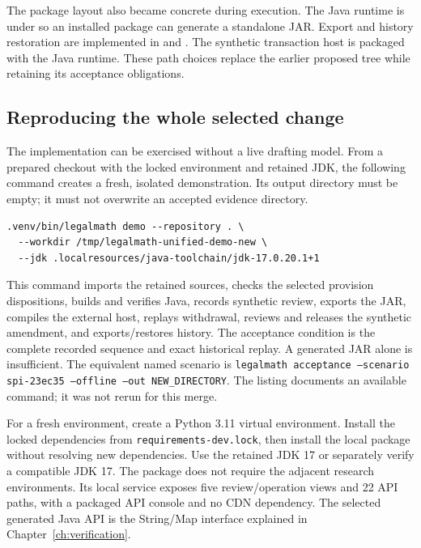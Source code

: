 The package layout also became concrete during execution. The Java runtime is
under  so an installed package can generate a
standalone JAR. Export and history restoration are implemented in
 and
. The synthetic transaction host is
packaged with the Java runtime. These path choices replace the earlier proposed
tree while retaining its acceptance obligations.

\subsection{Reproducing the whole selected change}

The implementation can be exercised without a live drafting model. From a
prepared checkout with the locked environment and retained JDK, the following
command creates a fresh, isolated demonstration. Its output directory must be
empty; it must not overwrite an accepted evidence directory.

\begin{lstlisting}[caption={Reproduce the complete local workbench scenario in a new directory.}]
.venv/bin/legalmath demo --repository . \
  --workdir /tmp/legalmath-unified-demo-new \
  --jdk .localresources/java-toolchain/jdk-17.0.20.1+1
\end{lstlisting}

This command imports the retained sources, checks the selected provision
dispositions, builds and verifies Java, records synthetic review, exports the
JAR, compiles the external host, replays withdrawal, reviews and releases the
synthetic amendment, and exports/restores history. The acceptance condition is
the complete recorded sequence and exact historical replay. A generated JAR
alone is insufficient. The equivalent named scenario is
\texttt{legalmath acceptance --scenario spi-23ec35 --offline --out NEW\_DIRECTORY}.
The listing documents an available command; it was not rerun for this merge.

For a fresh environment, create a Python 3.11 virtual environment. Install the
locked dependencies from \texttt{requirements-dev.lock}, then install the local
package without resolving new dependencies. Use the retained JDK 17 or separately verify a compatible
JDK 17. The package does not require the adjacent research environments. Its
local service exposes five review/operation views and 22 API paths, with a
packaged API console and no CDN dependency. The selected generated Java API is
the String/Map interface explained in Chapter~\ref{ch:verification}.

